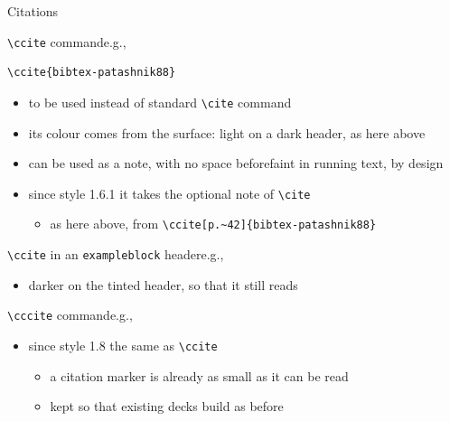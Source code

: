\begin{frame}{Citations}
%
\begin{block}{\texttt{\textbackslash{}ccite} command\textemdash{}e.g., }
\begin{verbatim}
\ccite{bibtex-patashnik88}
\end{verbatim}
\begin{itemize}
	\item to be used instead of standard \texttt{\textbackslash{}cite} command
	\item its colour comes from the surface: light on a dark header, as here above
	\item can be used as a note, with no space before\textemdash{}faint in running text, by design
	\item since style 1.6.1 it takes the optional note of \texttt{\textbackslash{}cite}
	\begin{itemize}
		\item as here above, from \verb|\ccite[p.~42]{bibtex-patashnik88}|
	\end{itemize}
\end{itemize}
\end{block}
%
\begin{exampleblock}{\texttt{\textbackslash{}ccite} in an \texttt{exampleblock} header\textemdash{}e.g., }
\begin{itemize}
	\item darker on the tinted header, so that it still reads
\end{itemize}
\end{exampleblock}
%
\begin{alertblock}{\texttt{\textbackslash{}cccite} command\textemdash{}e.g., }
\begin{itemize}
	\item since style 1.8 the same as \texttt{\textbackslash{}ccite}
	\begin{itemize}
		\item a citation marker is already as small as it can be read
		\item kept so that existing decks build as before
	\end{itemize}
\end{itemize}
\end{alertblock}
%
\end{frame}
